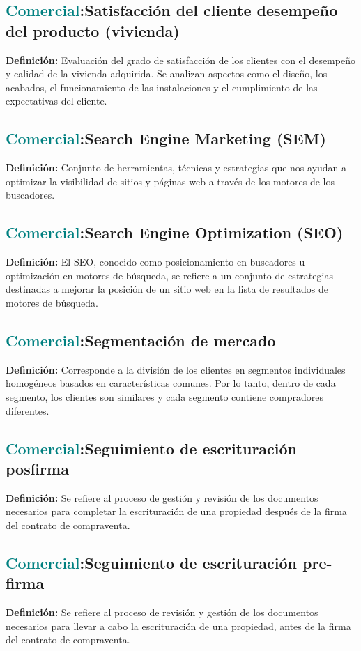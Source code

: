 \documentclass[12pt]{article}
\begin{document}
\subsection{\textcolor{teal}{Comercial}:{Satisfacción del cliente desempeño del producto (vivienda)}}
\textbf{Definición:} Evaluación del grado de satisfacción de los clientes con el desempeño y calidad de la vivienda adquirida. Se analizan aspectos como el diseño, los acabados, el funcionamiento de las instalaciones y el cumplimiento de las expectativas del cliente.
\subsection{\textcolor{teal}{Comercial}:{Search Engine Marketing (SEM)}}
\textbf{Definición:} Conjunto de herramientas, técnicas y estrategias que nos ayudan a optimizar la visibilidad de sitios y páginas web a través de los motores de los buscadores.
\subsection{\textcolor{teal}{Comercial}:{Search Engine Optimization (SEO)}}
\textbf{Definición:} El SEO, conocido como posicionamiento en buscadores u optimización en motores de búsqueda, se refiere a un conjunto de estrategias destinadas a mejorar la posición de un sitio web en la lista de resultados de motores de búsqueda.
\subsection{\textcolor{teal}{Comercial}:{Segmentación de mercado}}
\textbf{Definición:} Corresponde a la división de los clientes en segmentos individuales homogéneos basados en características comunes. Por lo tanto, dentro de cada segmento, los clientes son similares y cada segmento contiene compradores diferentes.
\subsection{\textcolor{teal}{Comercial}:{Seguimiento de escrituración posfirma}}
\textbf{Definición:} Se refiere al proceso de gestión y revisión de los documentos necesarios para completar la escrituración de una propiedad después de la firma del contrato de compraventa.
\subsection{\textcolor{teal}{Comercial}:{Seguimiento de escrituración pre-firma}}
\textbf{Definición:} Se refiere al proceso de revisión y gestión de los documentos necesarios para llevar a cabo la escrituración de una propiedad, antes de la firma del contrato de compraventa.
\end{document}
